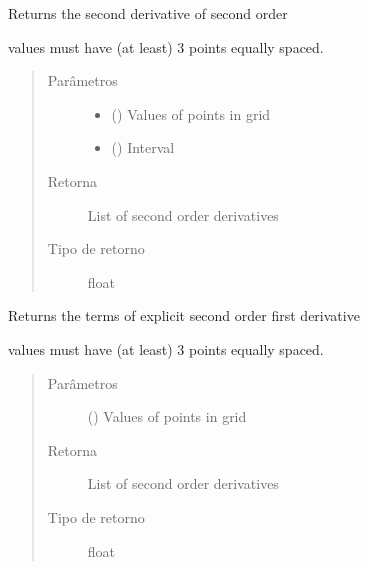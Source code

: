 \documentclass[letterpaper,10pt,brazil]{sphinxmanual}
\begin{document}

\begin{fulllineitems}
\label{\detokenize{source/wave:wave.fp_second_order}}
Returns the second derivative of second order

values must have (at least) 3 points equally spaced.
\begin{quote}\begin{description}
\item[{Parâmetros}] \leavevmode\begin{itemize}
\item {} 
 () \textendash{} Values of points in grid

\item {} 
 () \textendash{} Interval

\end{itemize}

\item[{Retorna}] \leavevmode
List of second order derivatives

\item[{Tipo de retorno}] \leavevmode
float

\end{description}\end{quote}

\end{fulllineitems}


\begin{fulllineitems}
\label{\detokenize{source/wave:wave.fp_second_order_explicit_terms}}
Returns the terms of explicit second order first derivative

values must have (at least) 3 points equally spaced.
\begin{quote}\begin{description}
\item[{Parâmetros}] \leavevmode
{} () \textendash{} Values of points in grid

\item[{Retorna}] \leavevmode
List of second order derivatives

\item[{Tipo de retorno}] \leavevmode
float

\end{description}\end{quote}

\end{fulllineitems}
\end{document}
